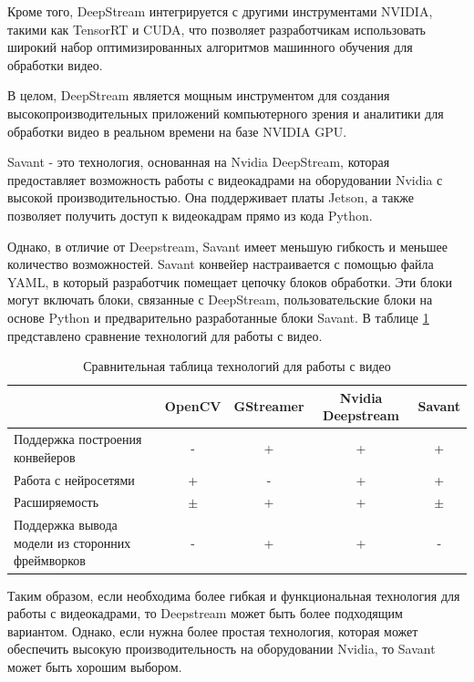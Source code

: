 Кроме того, DeepStream интегрируется с другими инструментами NVIDIA, такими как TensorRT и CUDA, что позволяет разработчикам использовать широкий набор оптимизированных алгоритмов машинного обучения для обработки видео.

В целом, DeepStream является мощным инструментом для создания высокопроизводительных приложений компьютерного зрения и аналитики для обработки видео в реальном времени на базе NVIDIA GPU.

Savant - это технология, основанная на Nvidia DeepStream, которая предоставляет возможность работы с видеокадрами на оборудовании Nvidia с высокой производительностью. Она поддерживает платы Jetson, а также позволяет получить доступ к видеокадрам прямо из кода Python.

Однако, в отличие от Deepstream, Savant имеет меньшую гибкость и меньшее количество возможностей. Savant конвейер настраивается с помощью файла YAML, в который разработчик помещает цепочку блоков обработки. Эти блоки могут включать блоки, связанные с DeepStream, пользовательские блоки на основе Python и предварительно разработанные блоки Savant. В таблице \ref{tab:tab1} представлено сравнение технологий для работы с видео.

\begin{table}    
    \caption{Сравнительная таблица технологий для работы с видео}
    \begin{tabularx}{\textwidth}{|X|c|c|c|c|}\hline
         & OpenCV & GStreamer  & Nvidia Deepstream & Savant \\ \hline
    Поддержка построения конвейеров  & -   & +    & +   & +         \\ \hline
    Работа с нейросетями       & +   & -    & +  & +         \\ \hline
    Расширяемость   & $\pm$   & +    & +  & $\pm$         \\ \hline
    Поддержка вывода модели из сторонних фреймворков & -  & +   & +  & -         \\ \hline
    \end{tabularx}
    \label{tab:tab1}
\end{table}


Таким образом, если необходима более гибкая и функциональная технология для работы с видеокадрами, то Deepstream может быть более подходящим вариантом. Однако, если нужна более простая технология, которая может обеспечить высокую производительность на оборудовании Nvidia, то Savant может быть хорошим выбором.


